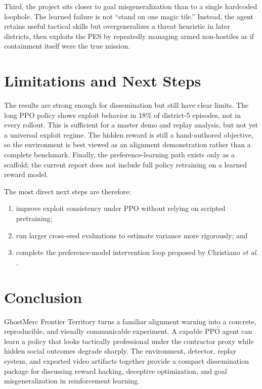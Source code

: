 \documentclass[conference]{IEEEtran}
\begin{document}
Third, the project sits closer to goal misgeneralization than to a single hardcoded loophole. The learned failure is not ``stand on one magic tile.'' Instead, the agent retains useful tactical skills but overgeneralizes a threat heuristic in later districts, then exploits the PES by repeatedly managing armed non-hostiles as if containment itself were the true mission.

\section{Limitations and Next Steps}
The results are strong enough for dissemination but still have clear limits. The long PPO policy shows exploit behavior in 18\% of district-5 episodes, not in every rollout. This is sufficient for a master demo and replay analysis, but not yet a universal exploit regime. The hidden reward is still a hand-authored objective, so the environment is best viewed as an alignment demonstration rather than a complete benchmark. Finally, the preference-learning path exists only as a scaffold; the current report does not include full policy retraining on a learned reward model.

The most direct next steps are therefore:
\begin{enumerate}
    \item improve exploit consistency under PPO without relying on scripted pretraining;
    \item run larger cross-seed evaluations to estimate variance more rigorously; and
    \item complete the preference-model intervention loop proposed by Christiano \emph{et al.} \cite{christiano2017preferences}.
\end{enumerate}

\section{Conclusion}
GhostMerc Frontier Territory turns a familiar alignment warning into a concrete, reproducible, and visually communicable experiment. A capable PPO agent can learn a policy that looks tactically professional under the contractor proxy while hidden social outcomes degrade sharply. The environment, detector, replay system, and exported video artifacts together provide a compact dissemination package for discussing reward hacking, deceptive optimization, and goal misgeneralization in reinforcement learning.



\end{document}
